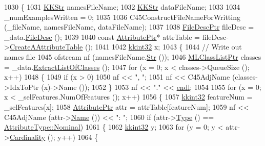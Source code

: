 \begin{DoxyCode}
1030 \{
1031   \hyperlink{class_k_k_b_1_1_k_k_str}{KKStr}  namesFileName;
1032   \hyperlink{class_k_k_b_1_1_k_k_str}{KKStr}  dataFileName;
1033 
1034   \_numExamplesWritten = 0;
1035   
1036   C45ConstructFileNameForWritting (\_fileName, namesFileName, dataFileName);
1037 
1038   \hyperlink{class_k_k_m_l_l_1_1_file_desc}{FileDescPtr} fileDesc = \_data.\hyperlink{class_k_k_m_l_l_1_1_feature_vector_list_a736923be9c4ac7553a5aa87dd24efd16}{FileDesc} ();
1039 
1040   \textcolor{keyword}{const} \hyperlink{class_k_k_m_l_l_1_1_attribute}{AttributePtr}*  attrTable = fileDesc->\hyperlink{class_k_k_m_l_l_1_1_file_desc_ab06cc9c9bd6ef17e487d5760ab4ff5f7}{CreateAAttributeTable} ();
1041 
1042   \hyperlink{namespace_k_k_b_a8fa4952cc84fda1de4bec1fbdd8d5b1b}{kkint32}  x;
1043   \{
1044     \textcolor{comment}{// Write out names file}
1045     ofstream  nf (namesFileName.\hyperlink{class_k_k_b_1_1_k_k_str_ad574e6c0fe7f6ce1ba3ab0a8ce2fbd52}{Str} ());
1046     \hyperlink{class_k_k_m_l_l_1_1_m_l_class_list}{MLClassListPtr}  classes = \_data.\hyperlink{class_k_k_m_l_l_1_1_feature_vector_list_af4bffa9713e7632b9e0e33f931528164}{ExtractListOfClasses} ();
1047     \textcolor{keywordflow}{for}  (x = 0;  x < classes->QueueSize ();  x++)
1048     \{
1049       \textcolor{keywordflow}{if}  (x > 0)
1050         nf << \textcolor{stringliteral}{", "};
1051       nf << C45AdjName (classes->IdxToPtr (x)->Name ());
1052     \}
1053     nf << \textcolor{stringliteral}{"."} << \hyperlink{namespace_k_k_b_ad1f50f65af6adc8fa9e6f62d007818a8}{endl};
1054 
1055     \textcolor{keywordflow}{for}  (x = 0;  x < \_selFeatures.NumOfFeatures ();  x++)
1056     \{
1057       \hyperlink{namespace_k_k_b_a8fa4952cc84fda1de4bec1fbdd8d5b1b}{kkint32}  featureNum = \_selFeatures[x];
1058       \hyperlink{class_k_k_m_l_l_1_1_attribute}{AttributePtr} attr = attrTable[featureNum];
1059       nf << C45AdjName (attr->\hyperlink{class_k_k_m_l_l_1_1_attribute_a3cd12e05138dfbda83c6802dc984e394}{Name} ()) << \textcolor{stringliteral}{": "};
1060       \textcolor{keywordflow}{if}  (attr->\hyperlink{class_k_k_m_l_l_1_1_attribute_ae867c1b4e264fb7be26941730364116d}{Type} () == \hyperlink{namespace_k_k_m_l_l_a99973706982b59debba670e2480555aba8c28d7c312116b8a46e2f466cb33d5b4}{AttributeType::Nominal})
1061       \{
1062         \hyperlink{namespace_k_k_b_a8fa4952cc84fda1de4bec1fbdd8d5b1b}{kkint32} y;
1063         \textcolor{keywordflow}{for}  (y = 0;  y < attr->\hyperlink{class_k_k_m_l_l_1_1_attribute_a7a7e8d04e3a93b47f6c2d1f99f0e42c6}{Cardinality} ();  y++)
1064         \{

\end{DoxyCode}
